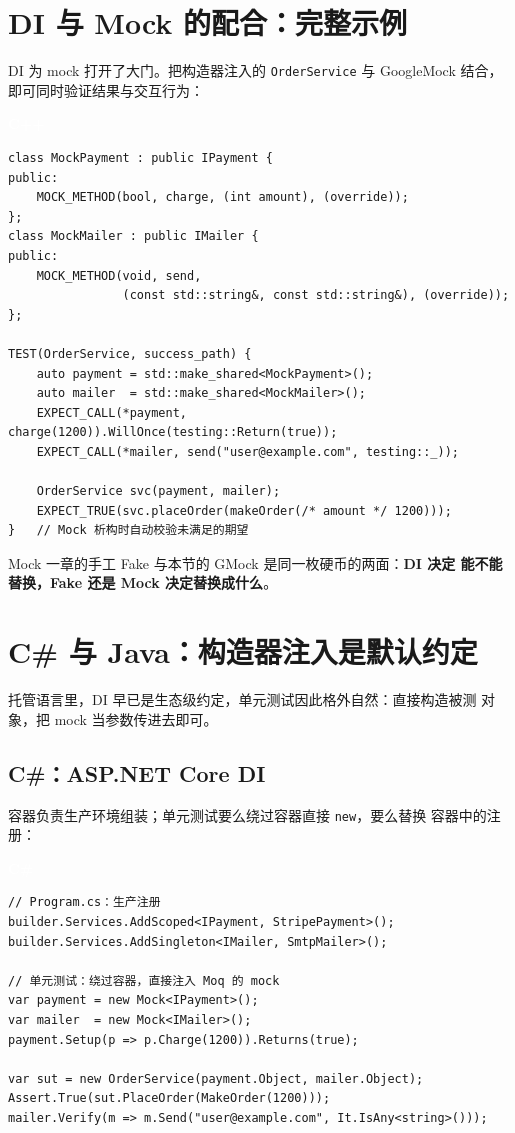\documentclass[12pt,a4paper,fontset=fandol]{ctexbook}
\newcommand{\cpplabel}{%
  \begin{tcolorbox}[enhanced,colback=cppheadbg,colframe=cppheadbg,
    arc=1mm,boxrule=0mm,left=6pt,right=6pt,top=2pt,bottom=2pt,
    halign=left,oversize]
    \textcolor{white}{\small\bfseries C++}
  \end{tcolorbox}\vspace{-4pt}}
\newcommand{\csharplabel}{%
  \begin{tcolorbox}[enhanced,colback=csharpheadbg,colframe=csharpheadbg,
    arc=1mm,boxrule=0mm,left=6pt,right=6pt,top=2pt,bottom=2pt,
    halign=left,oversize]
    \textcolor{white}{\small\bfseries C\#}
  \end{tcolorbox}\vspace{-4pt}}
\begin{document}
\section{DI 与 Mock 的配合：完整示例}

DI 为 mock 打开了大门。把构造器注入的 \texttt{OrderService} 与
GoogleMock 结合，即可同时验证结果与交互行为：

\cpplabel
\begin{lstlisting}
class MockPayment : public IPayment {
public:
    MOCK_METHOD(bool, charge, (int amount), (override));
};
class MockMailer : public IMailer {
public:
    MOCK_METHOD(void, send,
                (const std::string&, const std::string&), (override));
};

TEST(OrderService, success_path) {
    auto payment = std::make_shared<MockPayment>();
    auto mailer  = std::make_shared<MockMailer>();
    EXPECT_CALL(*payment, charge(1200)).WillOnce(testing::Return(true));
    EXPECT_CALL(*mailer, send("user@example.com", testing::_));

    OrderService svc(payment, mailer);
    EXPECT_TRUE(svc.placeOrder(makeOrder(/* amount */ 1200)));
}   // Mock 析构时自动校验未满足的期望
\end{lstlisting}

Mock 一章的手工 Fake 与本节的 GMock 是同一枚硬币的两面：\textbf{DI 决定
能不能替换，Fake 还是 Mock 决定替换成什么}。

\section{C\# 与 Java：构造器注入是默认约定}

托管语言里，DI 早已是生态级约定，单元测试因此格外自然：直接构造被测
对象，把 mock 当参数传进去即可。

\subsection{C\#：ASP.NET Core DI}

容器负责生产环境组装；单元测试要么绕过容器直接 \texttt{new}，要么替换
容器中的注册：

\csharplabel
\begin{lstlisting}
// Program.cs：生产注册
builder.Services.AddScoped<IPayment, StripePayment>();
builder.Services.AddSingleton<IMailer, SmtpMailer>();

// 单元测试：绕过容器，直接注入 Moq 的 mock
var payment = new Mock<IPayment>();
var mailer  = new Mock<IMailer>();
payment.Setup(p => p.Charge(1200)).Returns(true);

var sut = new OrderService(payment.Object, mailer.Object);
Assert.True(sut.PlaceOrder(MakeOrder(1200)));
mailer.Verify(m => m.Send("user@example.com", It.IsAny<string>()));
\end{lstlisting}
\end{document}
